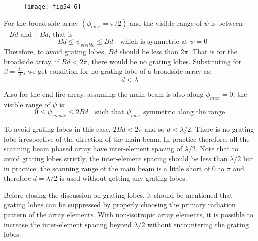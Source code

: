 \begin{figure}[h!]
	\texttt{[image: fig54\_6]}
	\centering
	\caption{}
	\label{54.9}
	
\end{figure}

For the broad side array $(\phi_{max} = \pi/2)$ and the visible range of $\psi$ is between $-Bd$ and $+Bd$, that is
$$
-Bd \leq \psi_{visible} \leq Bd \quad \text{which is symmetric at $\psi =0$}
$$
Therefore, to avoid grating lobes, $Bd$ should be less than $2\pi$. That is for the broadside array, if $Bd < 2\pi$, there would be no grating lobes. Substituting for $\beta = \frac{2\pi}{\lambda}$, we get condition for no grating lobe of a broadside array as:
$$d < \lambda $$

Also for the end-fire array, assuming the main beam is also along $\phi_{max} = 0$, the visible range of $\psi$ is:
$$
0 \leq \psi_{visible} \leq 2Bd \quad \text{such that $\psi_{max}$ symmetric along the range}
$$

To avoid grating lobes in this case, $2Bd < 2 \pi$ and so $d < \lambda/2$. There is no grating lobe irrespective of the direction of the main beam. In practice therefore, all the scanning beam phased array have inter-element spacing of $\lambda /2$. Note that to avoid grating lobes strictly, the inter-element spacing should be less than $\lambda / 2$ but in practice, the scanning range of the main beam is a little short of $0$ to $\pi$ and therefore $d=\lambda/2$ is used without getting any grating lobes.

Before closing the discussion on grating lobes, it should be mentioned that grating lobes can be suppressed by properly choosing the primary radiation pattern of the array elements. With  non-isotropic array elements, it is possible to increase the inter-element spacing beyond $\lambda/2$ without encountering the grating lobes.